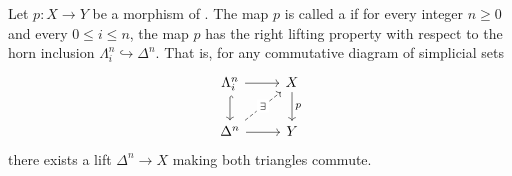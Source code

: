 \begin{definition} \label{definition:Kan_fibration_between_simplicial_sets}
Let $p : X \to Y$ be a morphism of . The map $p$ is called a  if for every integer $n \ge 0$ and every $0 \le i \le n$, the map $p$ has the right lifting property with respect to the horn inclusion $\Lambda_i^n \hookrightarrow \Delta^n$. That is, for any commutative diagram of simplicial sets
$$
\begin{tikzcd}
\Lambda_i^n \ar[r] \ar[d, hook] & X \ar[d, "p"] \\
\Delta^n \ar[r] \ar[ur, dashed, "\exists" description] & Y
\end{tikzcd}
$$
there exists a lift $\Delta^n \to X$ making both triangles commute.
\end{definition}
